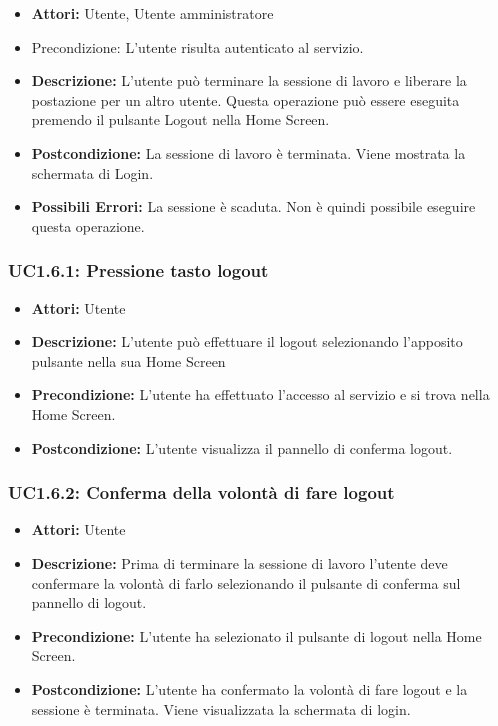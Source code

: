 \begin{itemize}
    \item \textbf{Attori:} Utente, Utente amministratore
    \item {Precondizione:} L'utente risulta autenticato al servizio.
    \item \textbf{Descrizione:} L'utente può terminare la sessione di lavoro e liberare la postazione per un altro utente. Questa operazione può essere eseguita premendo il pulsante Logout nella Home Screen.
    \item \textbf{Postcondizione:} La sessione di lavoro è terminata. Viene mostrata la schermata di Login.
    \item \textbf{Possibili Errori:} La sessione è scaduta. Non è quindi possibile eseguire questa operazione.
\end{itemize}

\subsubsection{UC1.6.1: Pressione tasto logout}

\begin{itemize}
    \item \textbf{Attori:} Utente
    \item \textbf{Descrizione:} L'utente può effettuare il logout selezionando l'apposito pulsante nella sua Home Screen
    \item \textbf{Precondizione:} L'utente ha effettuato l'accesso al servizio e si trova nella Home Screen.
    \item \textbf{Postcondizione:} L'utente visualizza il pannello di conferma logout.
\end{itemize}

\subsubsection{UC1.6.2: Conferma della volontà di fare logout}

\begin{itemize}
    \item \textbf{Attori:} Utente
    \item \textbf{Descrizione:} Prima di terminare la sessione di lavoro l'utente deve confermare la volontà di farlo selezionando il pulsante di conferma sul pannello di logout.
    \item \textbf{Precondizione:} L'utente ha selezionato il pulsante di logout nella Home Screen.
    \item \textbf{Postcondizione:} L'utente ha confermato la volontà di fare logout e la sessione è terminata. Viene visualizzata la schermata di login.
\end{itemize}

